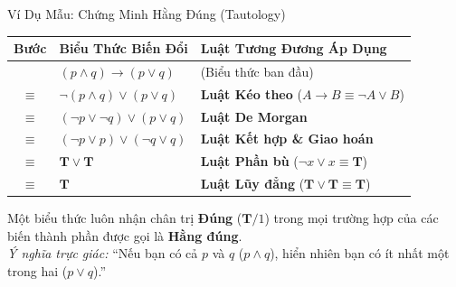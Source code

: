 \documentclass[aspectratio=169, 10pt]{beamer}
\begin{document}
\begin{frame}{Ví Dụ Mẫu: Chứng Minh Hằng Đúng (Tautology)}
  \begin{cozyExample}[Đề bài: Chứng minh biểu thức $E = (p \land q) \to (p \lor q)$ là một hằng đúng (luôn nhận giá trị 1)]
    \centering
    \renewcommand{\arraystretch}{0.98}
    \small
    \begin{tabular}{cll}
      \toprule
      \textbf{Bước} & \textbf{Biểu Thức Biến Đổi} & \textbf{Luật Tương Đương Áp Dụng} \\
      \midrule
      & $(p \land q) \to (p \lor q)$ & \textcolor{cozyMuted}{(Biểu thức ban đầu)} \\
      $\equiv$ & $\neg(p \land q) \lor (p \lor q)$ & \textbf{Luật Kéo theo} ($A \to B \equiv \neg A \lor B$) \\
      $\equiv$ & $(\neg p \lor \neg q) \lor (p \lor q)$ & \textbf{Luật De Morgan} \\
      $\equiv$ & $(\neg p \lor p) \lor (\neg q \lor q)$ & \textbf{Luật Kết hợp \& Giao hoán} \\
      $\equiv$ & $\mathbf{T} \lor \mathbf{T}$ & \textbf{Luật Phần bù} ($\neg x \lor x \equiv \mathbf{T}$) \\
      $\equiv$ & $\mathbf{T}$ & \textbf{Luật Lũy đẳng} ($\mathbf{T} \lor \mathbf{T} \equiv \mathbf{T}$) \\
      \bottomrule
    \end{tabular}
  \end{cozyExample}
  \vspace{0.02cm}
  \begin{cozyInsight}
    \footnotesize
    Một biểu thức luôn nhận chân trị \textbf{Đúng} ($\mathbf{T} / 1$) trong mọi trường hợp của các biến thành phần được gọi là \textbf{Hằng đúng}.\\
    \textit{Ý nghĩa trực giác:} ``Nếu bạn có cả $p$ và $q$ ($p \land q$), hiển nhiên bạn có ít nhất một trong hai ($p \lor q$).''
  \end{cozyInsight}
\end{frame}
\end{document}
